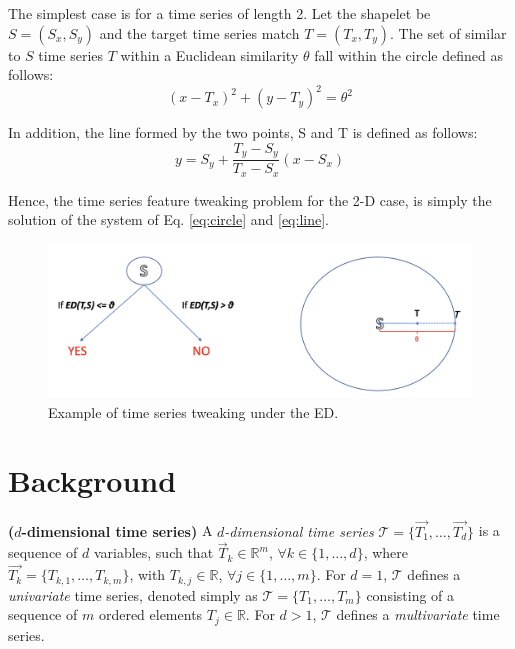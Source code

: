 \documentclass[smallextended,natbib]{svjour3}
\begin{document}
The simplest case is for a time series of length 2. Let the shapelet be $S=(S_x, S_y)$ and the target time series match $T=(T_x,T_y)$. The set of similar to $S$ time series $T$ within a Euclidean similarity $\theta$ fall within the circle defined as follows:
\begin{equation}
\label{eq:circle}
   (x-T_x)^2+ (y-T_y)^2 = \theta^2 
\end{equation}

In addition, the line formed by the two points, S and T is defined as follows:
\begin{equation}
\label{eq:line}
   y = S_y + \frac{T_y-S_y}{T_x-S_x} (x-S_x)
\end{equation}

Hence, the time series feature tweaking problem for the 2-D case, is simply the solution of the system of Eq. \ref{eq:circle} and \ref{eq:line}.  

\begin{figure}[h]
\centering
\includegraphics[scale=0.2]{exampleED.png}%
\caption{Example of time series tweaking under the ED.}\label{fig:exampleED}
\end{figure}


\section{Background}
\begin{definition} \textbf{($d$-dimensional time series)} %
A \emph{$d$-dimensional time series} $\mathcal{T} = \{\vec{T_{1}}, \ldots, \vec{T_{d}}\}$ is a sequence of $d$ variables, such that $\vec{T}_k\in \mathbb{R}^m$, $\forall k\in\{1,\dots,d\}$, where $\vec{T_k}=\{T_{k,1},\ldots,T_{k,m}\}$, with $T_{k,j}\in \mathbb{R}$, $\forall j\in\{1,\dots,m\}$. For $d=1$, $\mathcal{T}$ defines a \emph{univariate} time series, denoted simply as $\mathcal{T}=\{T_1,\ldots,T_m\}$ consisting of a sequence of $m$ ordered elements $T_j \in \mathbb{R}$. For $d>1$, $\mathcal{T}$ defines a \emph{multivariate} time series.
\end{definition}
\end{document}
